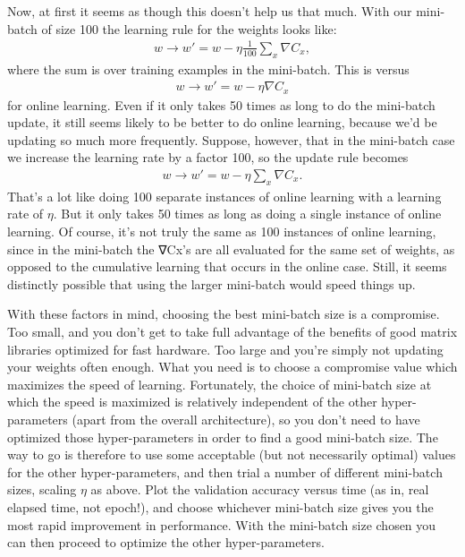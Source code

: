 \documentclass[a4paper,twoside,10pt]{book}
\begin{document}
Now, at first it seems as though this doesn't help us that much. With our mini-batch of size 100 the learning rule for the weights looks like:
\begin{eqnarray}
w \to w' = w-\eta \frac{1}{100} \sum_x \nabla C_x,
\label{eq:100}\end{eqnarray}
where the sum is over training examples in the mini-batch. This is versus
\begin{eqnarray}
w \rightarrow w' = w-\eta \nabla C_x
\label{eq:101}\end{eqnarray}
for online learning. Even if it only takes 50 times as long to do the mini-batch update, it still seems likely to be better to do online learning, because we'd be updating so much more frequently. Suppose, however, that in the mini-batch case we increase the learning rate by a factor 100, so the update rule becomes
\begin{eqnarray}
w \rightarrow w' = w-\eta \sum_x \nabla C_x.
\label{eq:102}\end{eqnarray}
That's a lot like doing 100 separate instances of online learning with a learning rate of $\eta$. But it only takes 50 times as long as doing a single instance of online learning. Of course, it's not truly the same as 100 instances of online learning, since in the mini-batch the ∇Cx's are all evaluated for the same set of weights, as opposed to the cumulative learning that occurs in the online case. Still, it seems distinctly possible that using the larger mini-batch would speed things up.

With these factors in mind, choosing the best mini-batch size is a compromise. Too small, and you don't get to take full advantage of the benefits of good matrix libraries optimized for fast hardware. Too large and you're simply not updating your weights often enough. What you need is to choose a compromise value which maximizes the speed of learning. Fortunately, the choice of mini-batch size at which the speed is maximized is relatively independent of the other hyper-parameters (apart from the overall architecture), so you don't need to have optimized those hyper-parameters in order to find a good mini-batch size. The way to go is therefore to use some acceptable (but not necessarily optimal) values for the other hyper-parameters, and then trial a number of different mini-batch sizes, scaling $\eta$ as above. Plot the validation accuracy versus time (as in, real elapsed time, not epoch!), and choose whichever mini-batch size gives you the most rapid improvement in performance. With the mini-batch size chosen you can then proceed to optimize the other hyper-parameters.
\end{document}
